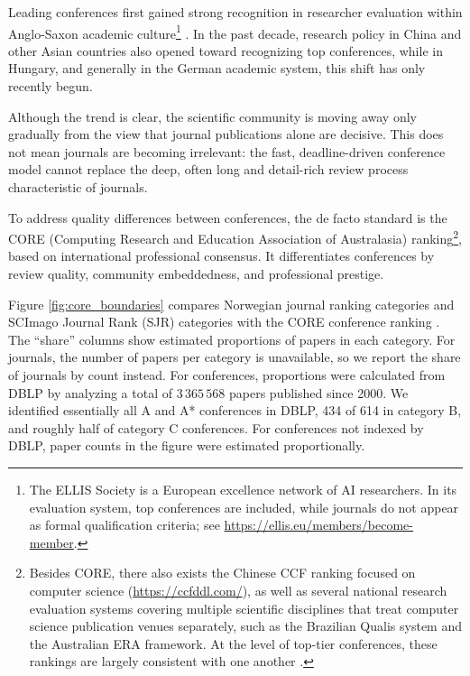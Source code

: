 \documentclass[12pt,a4paper]{article}
\begin{document}
Leading conferences first gained strong recognition in researcher evaluation within Anglo-Saxon academic culture\footnote{The ELLIS Society is a European excellence network of AI researchers. In its evaluation system, top conferences are included, while journals do not appear as formal qualification criteria; see \url{https://ellis.eu/members/become-member}.} \cite{fortnow2009time,vardi2009conferences}. In the past decade, research policy in China and other Asian countries also opened toward recognizing top conferences, while in Hungary, and generally in the German academic system, this shift has only recently begun.

Although the trend is clear, the scientific community is moving away only gradually from the view that journal publications alone are decisive. This does not mean journals are becoming irrelevant: the fast, deadline-driven conference model cannot replace the deep, often long and detail-rich review process characteristic of journals.

To address quality differences between conferences, the de facto standard is the CORE (Computing Research and Education Association of Australasia) ranking\footnote{Besides CORE, there also exists the Chinese CCF ranking focused on computer science (\url{https://ccfddl.com/}), as well as several national research evaluation systems covering multiple scientific disciplines that treat computer science publication venues separately, such as the Brazilian Qualis system \cite{laender2008assessing} and the Australian ERA framework. At the level of top-tier conferences, these rankings are largely consistent with one another \cite{li2018impact}.}, based on international professional consensus. It differentiates conferences by review quality, community embeddedness, and professional prestige.



Figure \ref{fig:core_boundaries} compares Norwegian journal ranking categories \cite{NorwegianRegister2025} and SCImago Journal Rank (SJR) categories with the CORE conference ranking \cite{coreweb}. The ``share'' columns show estimated proportions of papers in each category. For journals, the number of papers per category is unavailable, so we report the share of journals by count instead. For conferences, proportions were calculated from DBLP by analyzing a total of $3\,365\,568$ papers published since 2000. We identified essentially all A and A\!* conferences in DBLP, 434 of 614 in category B, and roughly half of category C conferences. For conferences not indexed by DBLP, paper counts in the figure were estimated proportionally.
\end{document}
